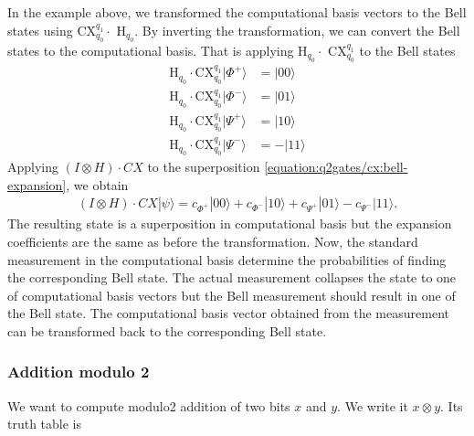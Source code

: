 \documentclass[letterpaper,10pt,english]{jupyterBook}
\begin{document}
\sphinxAtStartPar
In the example above, we transformed the computational basis vectors to the Bell states using CX\(_{q_0}^{q_1} \cdot\) H\(_{q_0}\).  By inverting the transformation, we can convert the Bell states to the computational basis.  That is applying H\(_{q_0} \cdot\) CX\(_{q_0}^{q_1}\) to the Bell states
\begin{align}
\text{H}_{q_0} \cdot \text{CX}_{q_0}^{q_1} |\Phi^{+}\rangle &= |00\rangle \\
\text{H}_{q_0} \cdot \text{CX}_{q_0}^{q_1} |\Phi^{-}\rangle &= |01\rangle \\
\text{H}_{q_0} \cdot \text{CX}_{q_0}^{q_1} |\Psi^{+}\rangle &= |10\rangle \\
\text{H}_{q_0} \cdot \text{CX}_{q_0}^{q_1} |\Psi^{-}\rangle &= -|11\rangle
\end{align}
\sphinxAtStartPar
Applying \((I \otimes H)\cdot CX\) to the superposition \eqref{equation:q2gates/cx:bell-expansion}, we obtain
\begin{equation}\label{equation:q2gates/cx:comp-expansion}
\begin{split}
(I \otimes H)\cdot CX |\psi\rangle = c_{\Phi^+} |00\rangle + c_{\Phi^-} |10\rangle + c_{\Psi^+} |01\rangle - c_{\Psi^-} |11\rangle .
\end{split}
\end{equation}
\sphinxAtStartPar
The resulting state is a superposition in computational basis but the expansion coefficients are the same as before the transformation.
Now, the standard measurement in the computational basis determine the probabilities of finding the corresponding Bell state.  The actual measurement collapses the state to one of computational basis vectors but the Bell measurement should result in one of the Bell state.
The computational basis vector obtained from the measurement can be transformed back to the corresponding Bell state.


\subsubsection{Addition modulo 2}
\label{\detokenize{q2gates/cx:addition-modulo-2}}
\sphinxAtStartPar
We want to compute modulo\sphinxhyphen{}2 addition of two bits \(x\) and \(y\). We write it \(x \otimes y\).  Its truth table is
\end{document}
